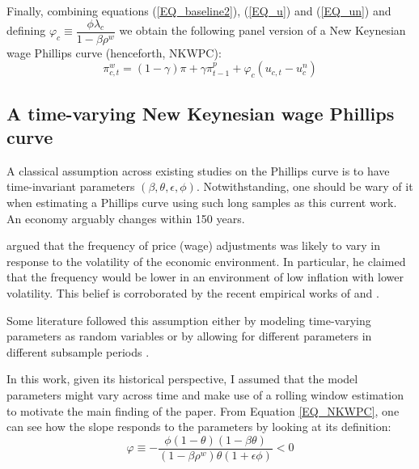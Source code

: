 \documentclass[12pt]{article}
\begin{document}
\begin{appendices}
Finally, combining equations (\ref{EQ_baseline2}), (\ref{EQ_u}) and (\ref{EQ_un}) and defining $\varphi_c \equiv \dfrac{\phi \lambda_c}{1 - \beta \rho^w}$ we obtain the following panel version of a New Keynesian wage Phillips curve (henceforth, NKWPC):
\begin{equation}
    \label{EQ_NKWPC}
    \pi_{c,t}^{w} = (1-\gamma)\pi + \gamma \pi^p_{t-1} + \varphi_c (u_{c,t} - u_c^n)
\end{equation}

\subsection{A time-varying New Keynesian wage Phillips curve \label{SS_FPA}}

A classical assumption across existing studies on the Phillips curve is to have time-invariant parameters $(\beta, \theta, \epsilon, \phi)$. Notwithstanding, one should be wary of it when estimating a Phillips curve using such long samples as this current work. An economy arguably changes within 150 years. 

\cite{Romer1990} argued that the frequency of price (wage) adjustments was likely to vary in response to the volatility of the economic environment. In particular, he claimed that the frequency would be lower in an environment of low inflation with lower volatility. This belief is corroborated by the recent empirical works of \cite{Gagnon2009} and \cite{Nakamura2018}. 

Some literature followed this assumption either by modeling time-varying parameters as random variables \citep{Romer1990, Primiceri2005} or by allowing for different parameters in different subsample periods \citep{Gali1999, Smets2007}.

In this work, given its historical perspective, I assumed that the model parameters might vary across time and make use of a rolling window estimation to motivate the main finding of the paper. From Equation \eqref{EQ_NKWPC}, one can see how the slope responds to the parameters by looking at its definition:
\begin{equation*}
    \varphi \equiv - \dfrac{\phi (1-\theta)(1-\beta \theta)}{(1 - \beta \rho^w) \theta (1+\epsilon \phi)} < 0   
\end{equation*}


\end{appendices}
\end{document}
